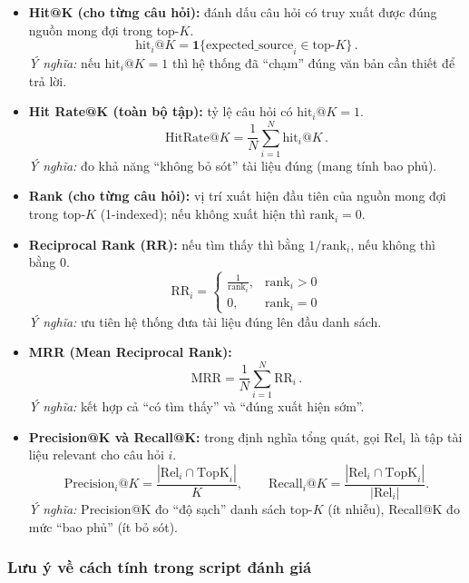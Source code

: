 \documentclass[../DoAn.tex]{subfiles}
\begin{document}
\begin{itemize}
    \item \textbf{Hit@K (cho từng câu hỏi):} đánh dấu câu hỏi có truy xuất được đúng nguồn mong đợi trong top-$K$.
    \[
        \mathrm{hit}_i@K = \mathbf{1}\{\text{expected\_source}_i \in \text{top-}K\}\,.
    \]
    \textit{Ý nghĩa:} nếu $\mathrm{hit}_i@K = 1$ thì hệ thống đã ``chạm'' đúng văn bản cần thiết để trả lời.

    \item \textbf{Hit Rate@K (toàn bộ tập):} tỷ lệ câu hỏi có $\mathrm{hit}_i@K = 1$.
    \[
        \mathrm{HitRate}@K = \frac{1}{N}\sum_{i=1}^{N} \mathrm{hit}_i@K\,.
    \]
    \textit{Ý nghĩa:} đo khả năng ``không bỏ sót'' tài liệu đúng (mang tính bao phủ).

    \item \textbf{Rank (cho từng câu hỏi):} vị trí xuất hiện đầu tiên của nguồn mong đợi trong top-$K$ (1-indexed); nếu không xuất hiện thì $\mathrm{rank}_i = 0$.

    \item \textbf{Reciprocal Rank (RR):} nếu tìm thấy thì bằng $1/\mathrm{rank}_i$, nếu không thì bằng 0.
    \[
        \mathrm{RR}_i =
        \begin{cases}
            \frac{1}{\mathrm{rank}_i}, & \mathrm{rank}_i > 0\\
            0, & \mathrm{rank}_i = 0
        \end{cases}
    \]
    \textit{Ý nghĩa:} ưu tiên hệ thống đưa tài liệu đúng lên đầu danh sách.

    \item \textbf{MRR (Mean Reciprocal Rank):}
    \[
        \mathrm{MRR} = \frac{1}{N}\sum_{i=1}^{N} \mathrm{RR}_i\,.
    \]
    \textit{Ý nghĩa:} kết hợp cả ``có tìm thấy'' và ``đúng xuất hiện sớm''.

    \item \textbf{Precision@K và Recall@K:} trong định nghĩa tổng quát, gọi $\mathrm{Rel}_i$ là tập tài liệu relevant cho câu hỏi $i$.
    \[
        \mathrm{Precision}_i@K = \frac{|\mathrm{Rel}_i \cap \mathrm{TopK}_i|}{K},\qquad
        \mathrm{Recall}_i@K = \frac{|\mathrm{Rel}_i \cap \mathrm{TopK}_i|}{|\mathrm{Rel}_i|}.
    \]
    \textit{Ý nghĩa:} Precision@K đo ``độ sạch'' danh sách top-$K$ (ít nhiễu), Recall@K đo mức ``bao phủ'' (ít bỏ sót).
\end{itemize}

\subsubsection{Lưu ý về cách tính trong script đánh giá}
\end{document}
